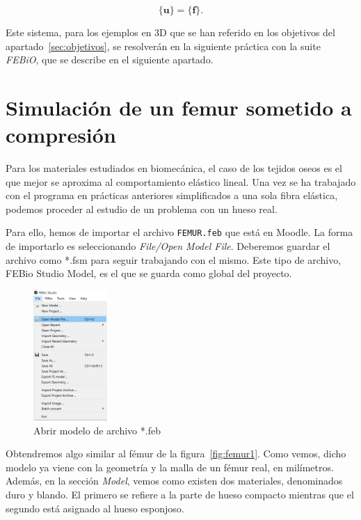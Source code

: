 \begin{equation}
[\mathbf{K}]\{\mathbf{u}\}=\{\mathbf{f}\}.
\end{equation}

Este sistema, para los ejemplos en 3D que se han referido en los objetivos del apartado~\ref{sec:objetivos}, se resolverán en la siguiente práctica con la suite \emph{FEBiO}, que se describe en el siguiente apartado.

\clearpage
\section{Simulación de un femur sometido a compresión}
\label{sec:femur}
Para los materiales estudiados en biomecánica, el caso de los tejidos oseos es el que mejor se aproxima al comportamiento elástico lineal. Una vez se ha trabajado con el programa en prácticas anteriores simplificados a una sola fibra elástica, podemos proceder al estudio de un problema con un hueso real.

Para ello, hemos de importar el archivo \texttt{FEMUR.feb} que está en Moodle. La forma de importarlo es seleccionando \emph{File/Open Model File}. Deberemos guardar el archivo como *.fsm para seguir trabajando con el mismo. Este tipo de archivo, FEBio Studio Model, es el que se guarda como global del proyecto.

\begin{figure}[!htp]
\centering
\includegraphics[width=0.25\textwidth]{figuras_2/import.png}
\caption{Abrir modelo de archivo *.feb}
\label{fig:femur0}
\end{figure}

Obtendremos algo similar al fémur de la figura~\ref{fig:femur1}. Como vemos, dicho modelo ya viene con la geometría y la malla de un fémur real, en milímetros. Además, en la sección \emph{Model}, vemos como existen dos materiales, denominados duro y blando. El primero se refiere a la parte de hueso compacto mientras que el segundo está asignado al hueso esponjoso.


